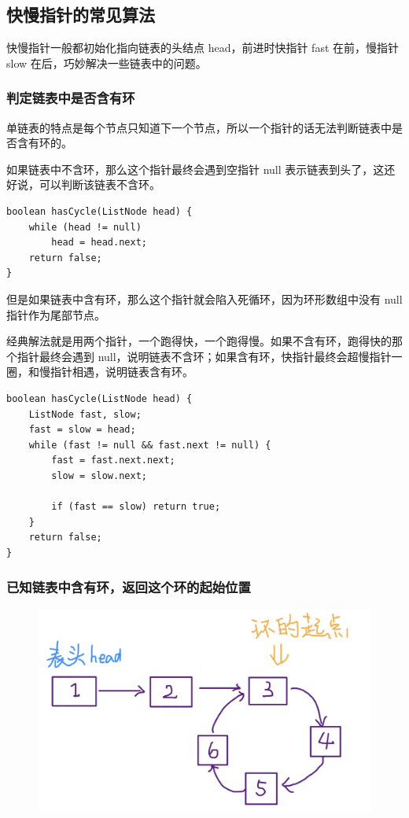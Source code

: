 \documentclass[12pt]{article}
\begin{document}
\subsection{快慢指针的常见算法}
快慢指针一般都初始化指向链表的头结点 head，前进时快指针 fast 在前，慢指针 slow 在后，巧妙解决一些链表中的问题。

\subsubsection{判定链表中是否含有环}
单链表的特点是每个节点只知道下一个节点，所以一个指针的话无法判断链表中是否含有环的。

如果链表中不含环，那么这个指针最终会遇到空指针 null 表示链表到头了，这还好说，可以判断该链表不含环。
\begin{lstlisting}
boolean hasCycle(ListNode head) {
    while (head != null)
        head = head.next;
    return false;
}
\end{lstlisting}

但是如果链表中含有环，那么这个指针就会陷入死循环，因为环形数组中没有 null 指针作为尾部节点。

经典解法就是用两个指针，一个跑得快，一个跑得慢。如果不含有环，跑得快的那个指针最终会遇到 null，说明链表不含环；如果含有环，快指针最终会超慢指针一圈，和慢指针相遇，说明链表含有环。
\begin{lstlisting}
boolean hasCycle(ListNode head) {
    ListNode fast, slow;
    fast = slow = head;
    while (fast != null && fast.next != null) {
        fast = fast.next.next;
        slow = slow.next;
        
        if (fast == slow) return true;
    }
    return false;
}
\end{lstlisting}

\subsubsection{已知链表中含有环，返回这个环的起始位置}
\begin{figure}[H]
    \centering
    \includegraphics[width=.6\textwidth]{fig/Double_Pointers_1.png}
\end{figure}
\end{document}
